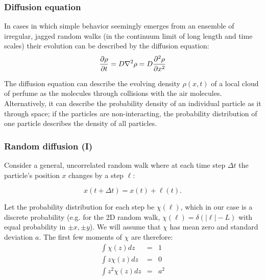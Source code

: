 \documentclass[hyperref={colorlinks=true}]{beamer}
\begin{document}
\begin{frame}%
  \frametitle{Diffusion equation}
  
  In cases in which simple behavior seemingly emerges from an ensemble of irregular, jagged random walks (in the continuum limit of long length and time scales) their evolution can be described by the diffusion equation:
  \begin{equation}
    \frac{\partial \rho}{\partial t} = D \nabla^2 \rho = D \frac{\partial^2 \rho}{\partial x^2}
    \label{eq:diffusion}
  \end{equation}
  
  The diffusion equation can describe the evolving density $\rho(x, t)$ of a local cloud of perfume as the molecules  through collisions with the air molecules. Alternatively, it can describe the probability density of an individual particle as it  through space; if the particles are non-interacting, the probability distribution of one particle describes the density of all particles.
  
\end{frame}


\begin{frame}%
  \frametitle{Random diffusion (I)}
  
  Consider a general, uncorrelated random walk where at each time step $\Delta t$ the particle's position $x$ changes by a step $\ell$:
  
  \begin{equation}
    x(t + \Delta t) = x(t) + \ell(t).
  \end{equation}
  
  Let the probability distribution for each step be $\chi(\ell)$, which in our case is a discrete probability (e.g. for the 2D random walk, $\chi(\ell) = \delta (|\ell| - L)$ with equal probability in $\pm x, \pm y$). We will assume that $\chi$ has mean zero and standard deviation $a$. The first few moments of $\chi$ are therefore:
  \begin{eqnarray}
    \int \chi(z) dz     &=& 1   \\
    \int z \chi(z) dz   &=& 0   \\
    \int z^2 \chi(z) dz &=& a^2  
  \end{eqnarray}

\end{frame}

\end{document}
